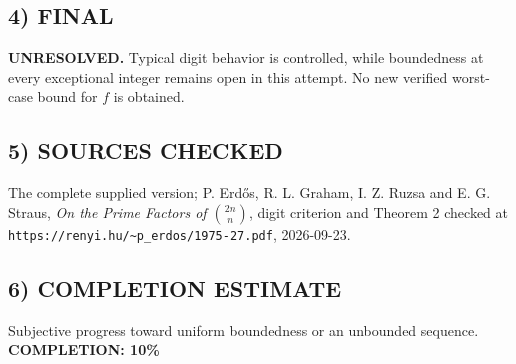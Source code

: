 \subsection*{4) FINAL}
\textbf{UNRESOLVED.} Typical digit behavior is controlled, while boundedness at every exceptional integer remains open in this attempt. No new verified worst-case bound for $f$ is obtained.
\subsection*{5) SOURCES CHECKED}
The complete supplied version; P. Erd\H{o}s, R. L. Graham, I. Z. Ruzsa and E. G. Straus, \emph{On the Prime Factors of $\binom{2n}{n}$}, digit criterion and Theorem 2 checked at \texttt{https://renyi.hu/\~{}p\_erdos/1975-27.pdf}, 2026-09-23.
\subsection*{6) COMPLETION ESTIMATE}
Subjective progress toward uniform boundedness or an unbounded sequence.
\textbf{COMPLETION: 10\%}
